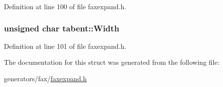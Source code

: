 Definition at line 100 of file faxexpand.\+h.

\hypertarget{structtabent_a89077787a5a69f73b7706c970df3700e}{
\subsubsection[{Width}]{\setlength{\rightskip}{0pt plus 5cm}unsigned char tabent\+::\+Width}}\label{structtabent_a89077787a5a69f73b7706c970df3700e}


Definition at line 101 of file faxexpand.\+h.



The documentation for this struct was generated from the following file\+:\begin{DoxyCompactItemize}
\item 
generators/fax/\hyperlink{faxexpand_8h}{faxexpand.\+h}\end{DoxyCompactItemize}
